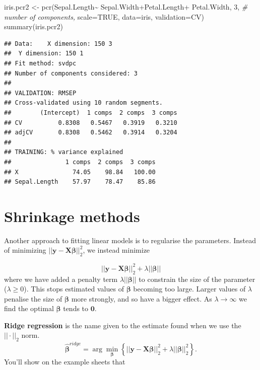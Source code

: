 \documentclass[
]{book}
\newenvironment{Shaded}{\begin{snugshade}}{\end{snugshade}}
\newcommand{\AttributeTok}[1]{\textcolor[rgb]{0.77,0.63,0.00}{#1}}
\newcommand{\CommentTok}[1]{\textcolor[rgb]{0.56,0.35,0.01}{\textit{#1}}}
\newcommand{\ConstantTok}[1]{\textcolor[rgb]{0.00,0.00,0.00}{#1}}
\newcommand{\DecValTok}[1]{\textcolor[rgb]{0.00,0.00,0.81}{#1}}
\newcommand{\FunctionTok}[1]{\textcolor[rgb]{0.00,0.00,0.00}{#1}}
\newcommand{\NormalTok}[1]{#1}
\newcommand{\OtherTok}[1]{\textcolor[rgb]{0.56,0.35,0.01}{#1}}
\newcommand{\SpecialCharTok}[1]{\textcolor[rgb]{0.00,0.00,0.00}{#1}}
\newcommand{\StringTok}[1]{\textcolor[rgb]{0.31,0.60,0.02}{#1}}
\theoremstyle{definition}
\theoremstyle{definition}
\theoremstyle{definition}
\theoremstyle{definition}
\theoremstyle{remark}
\begin{document}
\begin{Shaded}
\begin{Highlighting}[]
\NormalTok{iris.pcr2 }\OtherTok{\textless{}{-}} \FunctionTok{pcr}\NormalTok{(Sepal.Length}\SpecialCharTok{\textasciitilde{}}\NormalTok{ Sepal.Width}\SpecialCharTok{+}\NormalTok{Petal.Length}\SpecialCharTok{+}
\NormalTok{                   Petal.Width, }\DecValTok{3}\NormalTok{, }\CommentTok{\# number of components,}
                \AttributeTok{scale=}\ConstantTok{TRUE}\NormalTok{, }\AttributeTok{data=}\NormalTok{iris, }\AttributeTok{validation=}\StringTok{\textquotesingle{}CV\textquotesingle{}}\NormalTok{)}
\FunctionTok{summary}\NormalTok{(iris.pcr2)}
\end{Highlighting}
\end{Shaded}

\begin{verbatim}
## Data:    X dimension: 150 3 
##  Y dimension: 150 1
## Fit method: svdpc
## Number of components considered: 3
## 
## VALIDATION: RMSEP
## Cross-validated using 10 random segments.
##        (Intercept)  1 comps  2 comps  3 comps
## CV          0.8308   0.5467   0.3919   0.3210
## adjCV       0.8308   0.5462   0.3914   0.3204
## 
## TRAINING: % variance explained
##               1 comps  2 comps  3 comps
## X               74.05    98.84   100.00
## Sepal.Length    57.97    78.47    85.86
\end{verbatim}

\hypertarget{shrinkage-methods}{%
\section{Shrinkage methods}\label{shrinkage-methods}}

Another approach to fitting linear models is to regularise the parameters. Instead of minimizing \(||\mathbf y- \mathbf X\boldsymbol \beta||^2_2\), we instead minimize

\[||\mathbf y- \mathbf X\boldsymbol \beta||^2_2+\lambda||\boldsymbol \beta||\]
where we have added a penalty term \(\lambda||\boldsymbol \beta||\) to constrain the size of the parameter (\(\lambda\geq 0\)). This stops estimated values of \(\boldsymbol \beta\) becoming too large.
Larger values of \(\lambda\) penalise the size of \(\boldsymbol \beta\) more strongly, and so have a bigger effect. As \(\lambda \rightarrow \infty\) we find the optimal \(\boldsymbol \beta\) tends to \(\boldsymbol 0\).

\textbf{Ridge regression} is the name given to the estimate found when we use the \(||\cdot||_2\) norm.
\[\hat{\boldsymbol \beta}^{ridge} = \arg \min_{\boldsymbol \beta} \left\{||\mathbf y- \mathbf X\boldsymbol \beta||^2_2+\lambda||\boldsymbol \beta||_2^2 \right\}.\]
You'll show on the example sheets that
\end{document}
